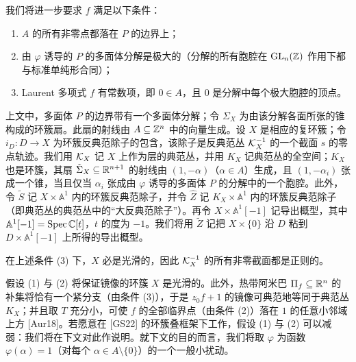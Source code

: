 我们将进一步要求 $f$ 满足以下条件：
\begin{enumerate}[label=\arabic*.,leftmargin=2em,itemsep=0.2em]
\item $A$ 的所有非零点都落在 $P$ 的边界上；
\item 由 $\varphi$ 诱导的 $P$ 的多面体分解是极大的（分解的所有胞腔在 $\operatorname{GL}_n(\mathbb{Z})$ 作用下都与标准单纯形合同）；
\item Laurent 多项式 $f$ 有常数项，即 $0\in A$，且 $0$ 是分解中每个极大胞腔的顶点。
\end{enumerate}


上文中，多面体 $P$ 的边界带有一个多面体分解；令 $\Sigma_X$ 为由该分解各面所张的锥构成的环簇扇。此扇的射线由 $A\subseteq\mathbb{Z}^n$ 中的向量生成。设 $X$ 是相应的复环簇；令 $i_D\colon D\to X$ 为环簇反典范除子的包含，该除子是反典范丛 $\mathcal{K}_X^{-1}$ 的一个截面 $s$ 的零点轨迹。我们用 $\mathcal{K}_X$ 记 $X$ 上作为层的典范丛，并用 $K_X$ 记典范丛的全空间；$K_X$ 也是环簇，其扇 $\tilde\Sigma_X\subseteq\mathbb{R}^{n+1}$ 的射线由 $(1,-\alpha)$（$\alpha\in A$）生成，且 $(1,-\alpha_i)$ 张成一个锥，当且仅当 $\alpha_i$ 张成由 $\varphi$ 诱导的多面体 $P$ 的分解中的一个胞腔。此外，令 $\tilde S$ 记 $X\times\mathbb A^1$ 内的环簇反典范除子，并令 $\hat Z$ 记 $K_X\times\mathbb A^1$ 内的环簇反典范除子（即典范丛的典范丛中的“大反典范除子”）。再令 $X\times\mathbb A^1[-1]$ 记导出概型，其中 $\mathbb A^1[-1]=\operatorname{Spec}\mathbb{C}[t]$，$t$ 的度为 $-1$。我们将用 $\tilde Z$ 记把 $X\times\{0\}$ 沿 $D$ 粘到 $D\times\mathbb A^1[-1]$ 上所得的导出概型。



在上述条件 (3) 下，$X$ 必是光滑的，因此 $\mathcal{K}_X^{-1}$ 的所有非零截面都是正则的。

假设 (1) 与 (2) 将保证镜像的环簇 $X$ 是光滑的。此外，热带阿米巴 $\Pi_f\subseteq\mathbb{R}^n$ 的补集将恰有一个紧分支（由条件 (3)），于是 $z_0f+1$ 的镜像可典范地等同于典范丛 $K_X$；并且取 $T$ 充分小，可使 $f$ 的全部临界点（由条件 (2)）落在 $1$ 的任意小邻域上方 [Aur18]。若愿意在 [GS22] 的环簇叠框架下工作，假设 (1) 与 (2) 可以减弱：我们将在下文对此作说明。就下文的目的而言，我们将取 $\varphi$ 为函数 $\varphi(\alpha)=1$（对每个 $\alpha\in A\setminus\{0\}$）的一个一般小扰动。

